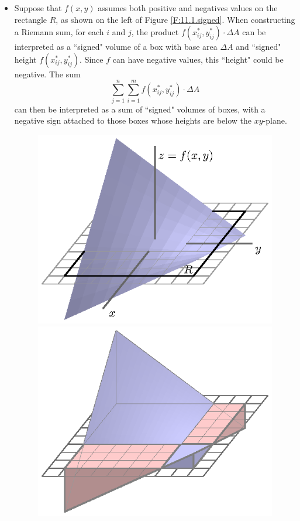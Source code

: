 \begin{itemize}
\item Suppose that $f(x,y)$ assumes both positive and negatives
  values on the rectangle $R$, as shown on the left of Figure
  \ref{F:11.1.signed}.  When constructing a Riemann sum, for each $i$ and $j$, the product $f(x_{ij}^*, y_{ij}^*) \cdot \Delta A$
can be interpreted as a ``signed" volume of a box with base area $\Delta A$ and ``signed" height $f(x_{ij}^*, y_{ij}^*)$. Since $f$ can have negative values, this ``height" could be negative. The sum
\[\sum_{j=1}^n \sum_{i=1}^m f(x_{ij}^*, y_{ij}^*) \cdot \Delta A\]
can then be interpreted as a sum of ``signed" volumes of boxes, with a
negative sign attached to those boxes whose heights are below the
$xy$-plane. 
\begin{figure}[ht]
  \begin{center}
    \includegraphics{figures/fig_11_1_signed_graph.eps}
    \hspace*{20pt}
    \includegraphics{figures/fig_11_1_signed_volume.eps}

\end{center}
\end{figure}
\end{itemize}
